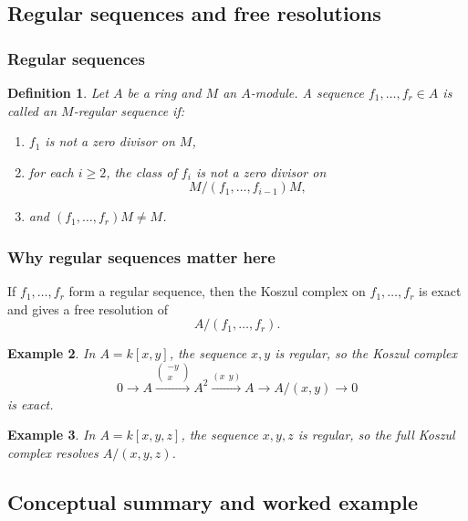 \documentclass[12pt,a4paper]{article}
\theoremstyle{notespace}
\newtheorem{definition}{Definition}[section]
\newtheorem{example}[definition]{Example}
\begin{document}
\subsection{Regular sequences and free resolutions}

\subsubsection{Regular sequences}

\begin{definition}
	Let \(A\) be a ring and \(M\) an \(A\)-module. A sequence \(f_1,\dots,f_r\in A\) is called an \emph{\(M\)-regular sequence} if:
	\begin{enumerate}[leftmargin=2em]
		\item \(f_1\) is not a zero divisor on \(M\),
		\item for each \(i\ge 2\), the class of \(f_i\) is not a zero divisor on
		\[
		M/(f_1,\dots,f_{i-1})M,
		\]
		\item and \((f_1,\dots,f_r)M\neq M\).
	\end{enumerate}
\end{definition}

\subsubsection{Why regular sequences matter here}

If \(f_1,\dots,f_r\) form a regular sequence, then the Koszul complex on \(f_1,\dots,f_r\) is exact and gives a free resolution of
\[
A/(f_1,\dots,f_r).
\]

\begin{example}
	In \(A=k[x,y]\), the sequence \(x,y\) is regular, so the Koszul complex
	\[
	0\to A \xrightarrow{\begin{pmatrix}-y\\x\end{pmatrix}} A^2 \xrightarrow{(x\ \ y)} A \to A/(x,y)\to 0
	\]
	is exact.
\end{example}

\begin{example}
	In \(A=k[x,y,z]\), the sequence \(x,y,z\) is regular, so the full Koszul complex resolves \(A/(x,y,z)\).
\end{example}

\subsection{Conceptual summary and worked example}
\end{document}
